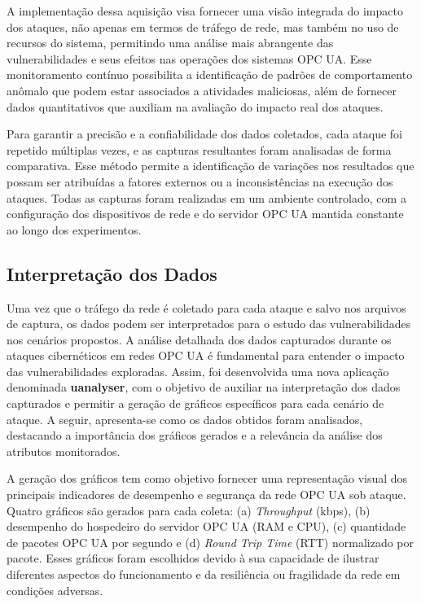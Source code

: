         A implementação dessa aquisição visa fornecer uma visão integrada do impacto dos ataques, não apenas em termos de tráfego de rede, mas também no uso de recursos do sistema, permitindo uma análise mais abrangente das vulnerabilidades e seus efeitos nas operações dos sistemas OPC UA. Esse monitoramento contínuo possibilita a identificação de padrões de comportamento anômalo que podem estar associados a atividades maliciosas, além de fornecer dados quantitativos que auxiliam na avaliação do impacto real dos ataques.

        Para garantir a precisão e a confiabilidade dos dados coletados, cada ataque foi repetido múltiplas vezes, e as capturas resultantes foram analisadas de forma comparativa. Esse método permite a identificação de variações nos resultados que possam ser atribuídas a fatores externos ou a inconsistências na execução dos ataques. Todas as capturas foram realizadas em um ambiente controlado, com a configuração dos dispositivos de rede e do servidor OPC UA mantida constante ao longo dos experimentos.

    \subsection{Interpretação dos Dados}

        Uma vez que o tráfego da rede é coletado para cada ataque e salvo nos arquivos de captura, os dados podem ser interpretados para o estudo das vulnerabilidades nos cenários propostos. A análise detalhada dos dados capturados durante os ataques cibernéticos em redes OPC UA é fundamental para entender o impacto das vulnerabilidades exploradas. Assim, foi desenvolvida uma nova aplicação denominada \textbf{uanalyser}, com o objetivo de auxiliar na interpretação dos dados capturados e permitir a geração de gráficos específicos para cada cenário de ataque. A seguir, apresenta-se como os dados obtidos foram analisados, destacando a importância dos gráficos gerados e a relevância da análise dos atributos monitorados.

        A geração dos gráficos tem como objetivo fornecer uma representação visual dos principais indicadores de desempenho e segurança da rede OPC UA sob ataque. Quatro gráficos são gerados para cada coleta: (a) \textit{Throughput} (kbps), (b) desempenho do hospedeiro do servidor OPC UA (RAM e CPU), (c) quantidade de pacotes OPC UA por segundo e (d) \textit{Round Trip Time} (RTT) normalizado por pacote. Esses gráficos foram escolhidos devido à sua capacidade de ilustrar diferentes aspectos do funcionamento e da resiliência ou fragilidade da rede em condições adversas.

